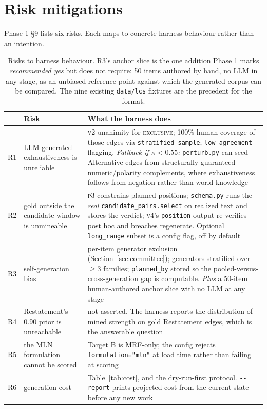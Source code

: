 \documentclass[11pt]{article}
\newcommand{\cExc}{\textsc{exclusive}}
\newcommand{\pymod}[1]{\texttt{#1}}
\begin{document}
\section{Risk mitigations}
\label{sec:risks}

Phase 1 §9 lists six risks. Each maps to concrete harness behaviour rather than an intention.

\begin{table}[h]\centering\small
\renewcommand{\arraystretch}{1.2}
\begin{tabular}{@{}lp{4.5cm}p{6.6cm}@{}}
\toprule
& \textbf{Risk} & \textbf{What the harness does}\\
\midrule
R1 & LLM-generated exhaustiveness is unreliable &
  \textsc{v2} unanimity for \cExc; 100\% human coverage of those edges via
  \texttt{stratified\_sample}; \texttt{low\_agreement} flagging. \emph{Fallback if $\kappa < 0.55$:}
  \pymod{perturb.py} can seed Alternative edges from structurally guaranteed
  numeric/polarity complements, where exhaustiveness follows from negation rather than world
  knowledge\\
R2 & gold outside the candidate window is unmineable &
  \textsc{p3} constrains planned positions; \pymod{schema.py} runs the \emph{real}
  \texttt{candidate\_pairs.select} on realized text and stores the verdict; \textsc{v4}'s
  \texttt{position} output re-verifies post hoc and breaches regenerate. Optional
  \texttt{long\_range} subset is a config flag, off by default\\
R3 & self-generation bias &
  per-item generator exclusion (Section~\ref{sec:committee}); generators stratified over $\geq$3
  families; \texttt{planned\_by} stored so the pooled-versus-cross-generation gap is computable.
  \emph{Plus} a 50-item human-authored anchor slice with no LLM at any stage\\
R4 & Restatement's $0.90$ prior is unreachable &
  not asserted. The harness reports the distribution of mined strength on gold Restatement edges,
  which is the answerable question\\
R5 & the MLN formulation cannot be scored &
  Target B is MRF-only; the config rejects \texttt{formulation="mln"} at load time rather than
  failing at scoring\\
R6 & generation cost &
  Table~\ref{tab:cost}, and the dry-run-first protocol. \texttt{-{}-report} prints projected cost
  from the current state before any new work\\
\bottomrule
\end{tabular}
\caption{Risks to harness behaviour. R3's anchor slice is the one addition Phase 1 marks
\emph{recommended yes} but does not require: 50 items authored by hand, no LLM in any stage, as an
unbiased reference point against which the generated corpus can be compared. The nine existing
\texttt{data/lcs} fixtures are the precedent for the format.}
\label{tab:risks}
\end{table}
\end{document}
